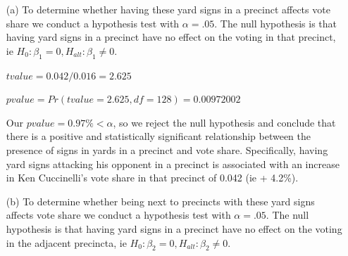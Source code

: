 \documentclass[12pt,letterpaper]{article}
\begin{document}
  

\begin{enumerate}
	\item [(a)] To determine whether having these yard signs in a precinct affects vote share we conduct a hypothesis test with $\alpha = .05$.  The null hypothesis is that having yard signs in a precinct have no effect on the voting in that precinct, ie $H_0: \beta_1 = 0, H_{alt}: \beta_1 \ne 0$.  

  

  
	$tvalue =  0.042/0.016 = 2.625$
	
	$pvalue =  Pr(tvalue = 2.625, df = 128) = 0.00972002$
	
  Our $pvalue = 0.97\% < \alpha$, so we reject the null hypothesis and conclude that there is a 
  positive and statistically significant relationship between the presence of signs in yards in a precinct and vote share.  Specifically, having yard signs attacking his opponent in a precinct is associated with an increase in Ken Cuccinelli's vote share in that precinct of 0.042 (ie + 4.2\%).
  

	\item [(b)]  To determine whether being
	next to precincts with these yard signs affects vote
	share we conduct a hypothesis test with $\alpha = .05$. The null hypothesis is that having yard signs in a precinct have no effect on the voting in the adjacent precincta, ie $H_0: \beta_2 = 0, H_{alt}: \beta_2 \ne 0$. 
	
  


\end{enumerate}
\end{document}

